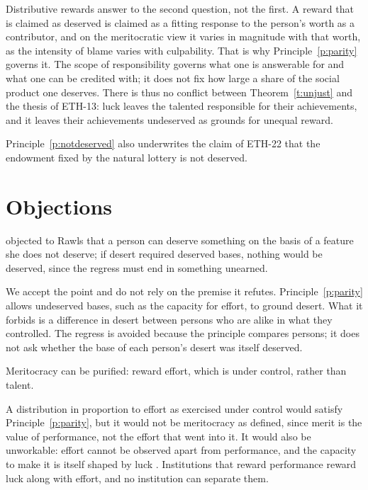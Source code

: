 \documentclass{situationist-preprint}
\begin{document}
Distributive rewards answer to the second question, not the first. A reward that is claimed as deserved is claimed as a fitting response to the person's worth as a contributor, and on the meritocratic view it varies in magnitude with that worth, as the intensity of blame varies with culpability. That is why Principle~\ref{p:parity} governs it. The scope of responsibility governs what one is answerable for and what one can be credited with; it does not fix how large a share of the social product one deserves. There is thus no conflict between Theorem~\ref{t:unjust} and the thesis of ETH-13: luck leaves the talented responsible for their achievements, and it leaves their achievements undeserved as grounds for unequal reward.

Principle~\ref{p:notdeserved} also underwrites the claim of ETH-22 that the endowment fixed by the natural lottery is not deserved.

\section{Objections}

\begin{objection}
\citet[ch.~7]{Nozick1974} objected to Rawls that a person can deserve something on the basis of a feature she does not deserve; if desert required deserved bases, nothing would be deserved, since the regress must end in something unearned.
\end{objection}

\begin{reply}
We accept the point and do not rely on the premise it refutes. Principle~\ref{p:parity} allows undeserved bases, such as the capacity for effort, to ground desert. What it forbids is a difference in desert between persons who are alike in what they controlled. The regress is avoided because the principle compares persons; it does not ask whether the base of each person's desert was itself deserved.
\end{reply}

\begin{objection}[Effort]
Meritocracy can be purified: reward effort, which is under control, rather than talent.
\end{objection}

\begin{reply}
A distribution in proportion to effort as exercised under control would satisfy Principle~\ref{p:parity}, but it would not be meritocracy as defined, since merit is the value of performance, not the effort that went into it. It would also be unworkable: effort cannot be observed apart from performance, and the capacity to make it is itself shaped by luck \citep[\S 17]{Rawls1971}. Institutions that reward performance reward luck along with effort, and no institution can separate them.
\end{reply}
\end{document}
